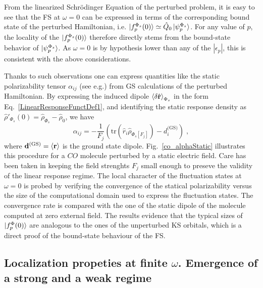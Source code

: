 \documentclass[reprint,aps,prb]{revtex4-1}
\newcommand{\eps}{\epsilon}
\newcommand{\be}{\begin{equation}}
\newcommand{\ee}{\end{equation}}
\newcommand{\op}[1]{\hat {#1}}
\newcommand{\trace}[1]{\mathrm{tr}\left(#1\right)}
\newcommand{\dmnot}{\op{\rho}_0}
\newcommand{\dm}{\op{\rho}}
\begin{document}
From the linearized Schr\"odinger Equation of the perturbed problem, it is easy to see that the FS at $\omega=0$ can be expressed
in terms of the corresponding bound state of the perturbed Hamiltonian, i.e.
$\ket{f_p^{\Phi_s}(0)} \simeq \op Q_0 \ket{\psi_p^{\Phi_s}}$.
For any value of $p$, the locality of the $\ket{f_p^{\Phi_s}(0)}$ therefore directly stems from the
bound-state behavior of $\ket{\psi_p^{\Phi_s}}$. As $\omega=0$ is by hypothesis
lower than any of the $|\eps_p|$, this is consistent with the above considerations.

Thanks to such observations one can express quantities like the static polarizability tensor $\alpha_{ij}$ (see e.g.\cite{DebElecField}) from GS calculations of the perturbed Hamiltonian.
By expressing the induced dipole $\braket{\delta \op{\mathbf r}}_{\Phi_s}$ in the form Eq.~\eqref{LinearResponseFunctDef1}, and identifying the static response density as $\dm'_{\Phi_s}(0) = \dm_{\Phi_s} -\dmnot $, we have
\be \label{staticalpha}
\alpha_{ij} =
-\frac{1}{F_j} \left(\trace{\op r_i \dm_{\Phi_s[F_j]}} - d^{\text{(GS)}}_i \right)\;,
\ee
where $\mathbf d^\text{(GS)}=\braket{\mathbf r}$ is the ground state dipole.
Fig.~\eqref{co_alphaStatic} illustrates this procedure for a $CO$ molecule
perturbed by a static electric field.
Care has been taken in keeping the field strenghts $F_j$ small enough to
preseve the validity of the linear response regime.
The local character of the fluctuation states at $\omega=0$ is
probed by verifying the convergence of the statical polarizability versus
the size of the computational domain used to express the fluctuation states. The convergence rate is compared with the
one of the static dipole of the molecule computed at zero external field.
The results evidence that the typical sizes of $\ket{f^\Phi_p(0)}$ are analogous to the ones of the unperturbed KS orbitals, which is a direct proof of the bound-state behaviour of the FS.

\subsection{Localization propeties at finite $\omega$. Emergence of a strong and a weak regime}
\end{document}
